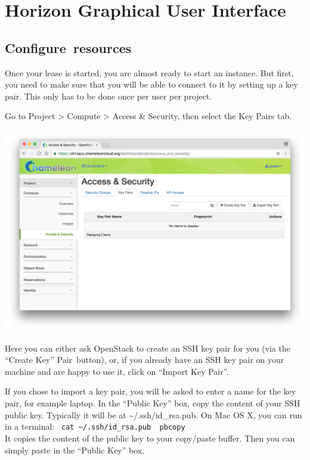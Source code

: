 \FILENAME

\chapter{Horizon Graphical User Interface}

\section{Configure~resources}\label{configureresources}

Once your lease is started, you are almost ready to start an instance.
But first, you need to make sure that you will be able to connect to it
by setting up a key pair. This only has to be done once per user per
project.

Go to Project \textgreater{} Compute \textgreater{} Access \& Security,
then select the Key Pairs tab.

\includegraphics[width=\columnwidth]{images/chameleon/Screen-Shot-2016-10-26-at-14-37-00.png}

Here you can either ask OpenStack to create an SSH key pair for you (via
the ``Create Key'' Pair~button), or, if you already have an SSH key pair
on your machine and are happy to use it, click on ``Import Key Pair''.

If you chose to import a key pair, you will be asked to enter a name for
the key pair, for example laptop. In the ``Public Key'' box, copy the
content of your SSH public key. Typically it will be at
\textasciitilde{}/.ssh/id\_rsa.pub. On Mac OS X, you can run in a
terminal:
~\texttt{cat\ \textasciitilde{}/.ssh/id\_rsa.pub\ \textbar{}\ pbcopy}\\
It copies the content of the public key to your copy/paste buffer. Then
you can simply paste in the ``Public Key'' box.

